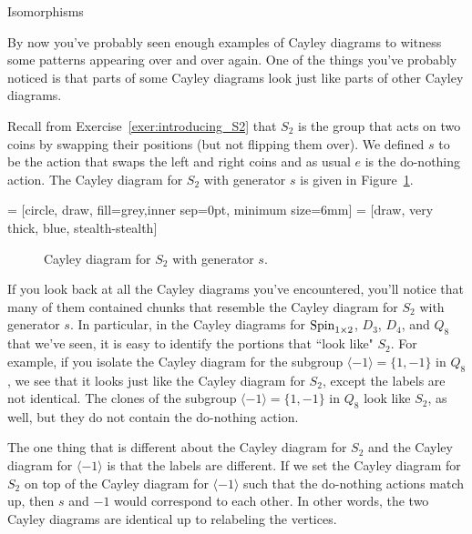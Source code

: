\begin{section}{Isomorphisms}

By now you've probably seen enough examples of Cayley diagrams to witness some patterns appearing over and over again.    One of the things you've probably noticed is that parts of some Cayley diagrams look just like parts of other Cayley diagrams.

Recall from Exercise~\ref{exer:introducing_S2} that $S_2$ is the group that acts on two coins by swapping their positions (but not flipping them over).  We defined $s$ to be the action that swaps the left and right coins and as usual $e$ is the do-nothing action.  The Cayley diagram for $S_2$ with generator $s$ is given in Figure~\ref{fig:S2}. 

 = [circle, draw, fill=grey,inner sep=0pt, minimum size=6mm]
 = [draw, very thick, blue, stealth-stealth]

\begin{figure}
\centering
{}
\caption{Cayley diagram for $S_2$ with generator $s$.}\label{fig:S2}
\end{figure}

If you look back at all the Cayley diagrams you've encountered, you'll notice that many of them contained chunks that resemble the Cayley diagram for $S_2$ with generator $s$.  In particular, in the Cayley diagrams for $\operatorname{Spin}_{1\times 2}$, $D_3$, $D_4$, and $Q_8$ that we've seen, it is easy to identify the portions that ``look like" $S_2$.  For example, if you isolate the Cayley diagram for the subgroup $\langle -1\rangle=\{1,-1\}$ in $Q_8$, we see that it looks just like the Cayley diagram for $S_2$, except the labels are not identical.  The clones of the subgroup $\langle -1\rangle=\{1,-1\}$ in $Q_8$ look like $S_2$, as well, but they do not contain the do-nothing action.  

The one thing that is different about the Cayley diagram for $S_2$ and the Cayley diagram for $\langle -1\rangle$ is that the labels are different.  If we set the Cayley diagram for $S_2$ on top of the Cayley diagram for $\langle -1\rangle$ such that the do-nothing actions match up, then $s$ and $-1$ would correspond to each other.  In other words, the two Cayley diagrams are identical up to relabeling the vertices.


\end{section}
